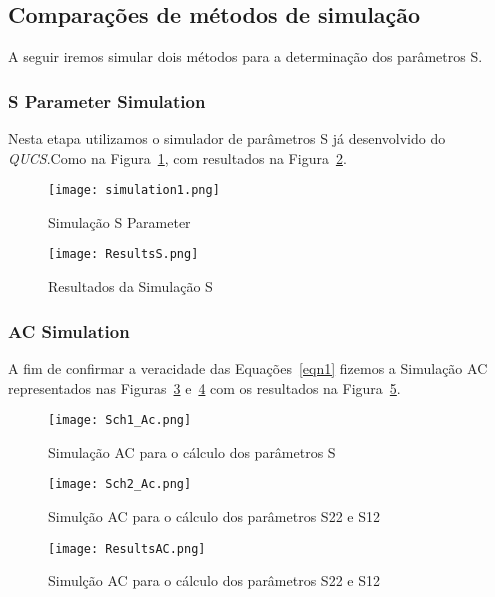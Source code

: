 \documentclass[a4paper,12pt]{proc}
\begin{document}
\subsection{Comparações de métodos de simulação}

A seguir iremos simular dois métodos para a determinação dos parâmetros S.

\subsubsection{S Parameter Simulation}

Nesta etapa utilizamos o simulador de parâmetros S já desenvolvido do \textit{QUCS}.Como na Figura~\ref{Sch:S}, com resultados na Figura~\ref{Sim:S}.

\begin{figure}[htbp]
    \centering
    \texttt{[image: simulation1.png]}
    \caption{Simulação S Parameter}
    \label{Sch:S}
\end{figure}

\begin{figure}[htbp]
    \centering
    \texttt{[image: ResultsS.png]}
    \caption{Resultados da Simulação S}
    \label{Sim:S}
\end{figure}


\subsubsection{AC Simulation}

A fim de confirmar a veracidade das Equações~\ref{eqn1} fizemos a Simulação AC representados nas Figuras~\ref{Sch:Ac1} e~\ref{Sch:Ac2} com os resultados na Figura~\ref{Sim:AC}.


\begin{figure}[htbp]
    \centering
    \texttt{[image: Sch1\_Ac.png]}
    \caption{Simulação AC para o cálculo dos parâmetros S}
    \label{Sch:Ac1}
\end{figure}

\begin{figure}[htbp]
    \centering
    \texttt{[image: Sch2\_Ac.png]}
    \caption{Simulção AC para o cálculo dos parâmetros S22 e S12}
    \label{Sch:Ac2}
\end{figure}

\begin{figure}[htbp]
    \centering
    \texttt{[image: ResultsAC.png]}
    \caption{Simulção AC para o cálculo dos parâmetros S22 e S12}
    \label{Sim:AC}
\end{figure}
\end{document}
